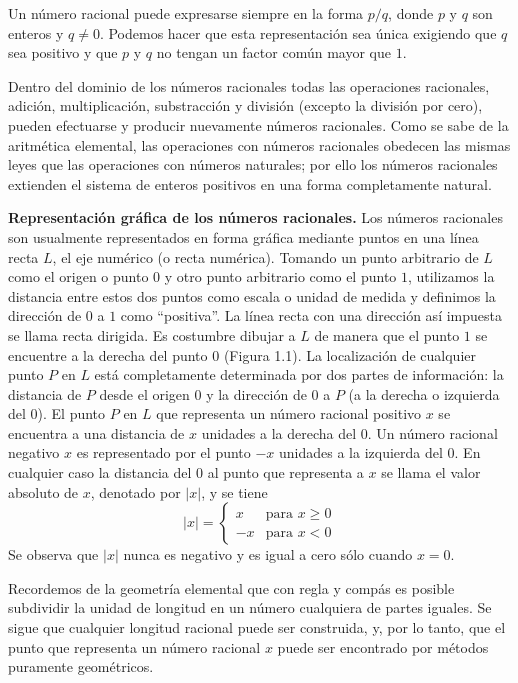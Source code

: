 \documentclass[12pt]{book}
\theoremstyle{definition}
\begin{document}
Un número racional puede expresarse siempre en la forma $p/q$, donde $p$ y $q$ son enteros y $q \neq 0$. Podemos hacer que esta representación sea única exigiendo que $q$ sea positivo y que $p$ y $q$ no tengan un factor común mayor que $1$.

Dentro del dominio de los números racionales todas las operaciones racionales, adición, multiplicación, substracción y división (excepto la división por cero), pueden efectuarse y producir nuevamente números racionales. Como se sabe de la aritmética elemental, las operaciones con números racionales obedecen las mismas leyes que las operaciones con números naturales; por ello los números racionales extienden el sistema de enteros positivos en una forma completamente natural.

\textbf{Representación gráfica de los números racionales.} Los números racionales son usualmente representados en forma gráfica mediante puntos en una línea recta $L$, el eje numérico (o recta numérica). Tomando un punto arbitrario de $L$ como el origen o punto $0$ y otro punto arbitrario como el punto $1$, utilizamos la distancia entre estos dos puntos como escala o unidad de medida y definimos la dirección de $0$ a $1$ como ``positiva''. La línea recta con una dirección así impuesta se llama recta dirigida. Es costumbre dibujar a $L$ de manera que el punto $1$ se encuentre a la derecha del punto $0$ (Figura 1.1). La localización de cualquier punto $P$ en $L$ está completamente determinada por dos partes de información: la distancia de $P$ desde el origen $0$ y la dirección de $0$ a $P$ (a la derecha o izquierda del $0$). El punto $P$ en $L$ que representa un número racional positivo $x$ se encuentra a una distancia de $x$ unidades a la derecha del $0$. Un número racional negativo $x$ es representado por el punto $-x$ unidades a la izquierda del $0$. En cualquier caso la distancia del $0$ al punto que representa a $x$ se llama el valor absoluto de $x$, denotado por $|x|$, y se tiene
\[
|x| = \begin{cases}
x & \text{para } x \ge 0 \\
-x & \text{para } x < 0
\end{cases}
\]
Se observa que $|x|$ nunca es negativo y es igual a cero sólo cuando $x = 0$.

Recordemos de la geometría elemental que con regla y compás es posible subdividir la unidad de longitud en un número cualquiera de partes iguales. Se sigue que cualquier longitud racional puede ser construida, y, por lo tanto, que el punto que representa un número racional $x$ puede ser encontrado por métodos puramente geométricos.
\end{document}
